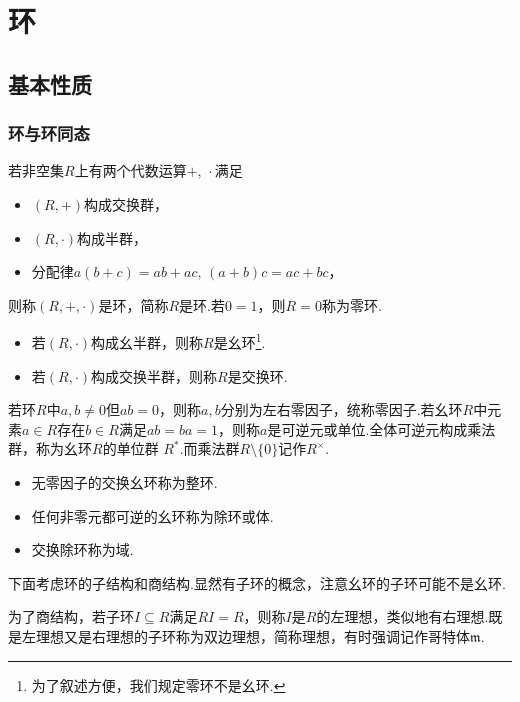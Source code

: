 \chapter{环}
\section{基本性质}
\subsection{环与环同态}
\begin{definition}
    若非空集$R$上有两个代数运算$+,\,\cdotp$满足
    \begin{itemize}
        \item $(R,+)$构成交换群，
        \item $(R,\cdotp)$构成半群，
        \item 分配律$a(b+c)=ab+ac,\,(a+b)c=ac+bc$，
    \end{itemize}
    则称$(R,+,\cdotp)$是{\heiti 环}，简称$R$是环.若$0=1$，则$R=0$称为{\heiti 零环}.
    \begin{itemize}
        \item 若$(R,\cdotp)$构成幺半群，则称$R$是{\heiti 幺环}\footnote{为了叙述方便，我们规定零环不是幺环.}.
        \item 若$(R,\cdotp)$构成交换半群，则称$R$是{\heiti 交换环}.
    \end{itemize}
    
    若环$R$中$a,b\ne 0$但$ab=0$，则称$a,b$分别为{\heiti 左右零因子}，统称{\heiti 零因子}.若幺环$R$中元素$a\in R$存在$b\in R$满足$ab=ba=1$，则称$a$是{\heiti 可逆元}或{\heiti 单位}.全体可逆元构成乘法群，称为幺环$R$的{\heiti 单位群} $R^*$.而乘法群$R\setminus\{0\}$记作$R^{\times}$.
    \begin{itemize}
        \item 无零因子的交换幺环称为{\heiti 整环}.
        \item 任何非零元都可逆的幺环称为{\heiti 除环}或{\heiti 体}.
        \item 交换除环称为{\heiti 域}.
    \end{itemize}
\end{definition}

下面考虑环的子结构和商结构.显然有{\heiti 子环}的概念，注意幺环的子环可能不是幺环.

为了商结构，若子环$I\subseteq R$满足$RI=R$，则称$I$是$R$的{\heiti 左理想}，类似地有{\heiti 右理想}.既是左理想又是右理想的子环称为{\heiti 双边理想}，简称{\heiti 理想}，有时强调记作哥特体$\mathfrak{m}$.

